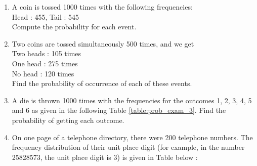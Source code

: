 \renewcommand{\theequation}{\theenumi}
\begin{enumerate}[label=\arabic*.,ref=\thesubsection.\theenumi]
	\item A coin is tossed 1000 times with the following frequencies:\\
Head : 455, Tail : 545\\
Compute the probability for each event.\\
\solution

   \item Two coins are tossed simultaneously 500 times, and we get\\
       Two heads : 105 times\\
       One head : 275 times\\
       No head : 120 times\\
Find the probability of occurrence of each of these events.\\
\solution

   \item A die is thrown 1000 times with the frequencies for the outcomes 1, 2, 3, 4, 5 and 6 as given in the following Table \ref{table:prob_exam_3}.
Find the probability of getting each outcome.

\begin{table}[!ht]
\centering
{}
\caption{}
\label{table:prob_exam_3}
\end{table}
\solution


   \item On one page of a telephone directory, there were 200 telephone numbers.
The frequency distribution of their unit place digit (for example, in the number 25828573, the unit place digit is 3) is given in Table below :\\

\\



\end{enumerate}
